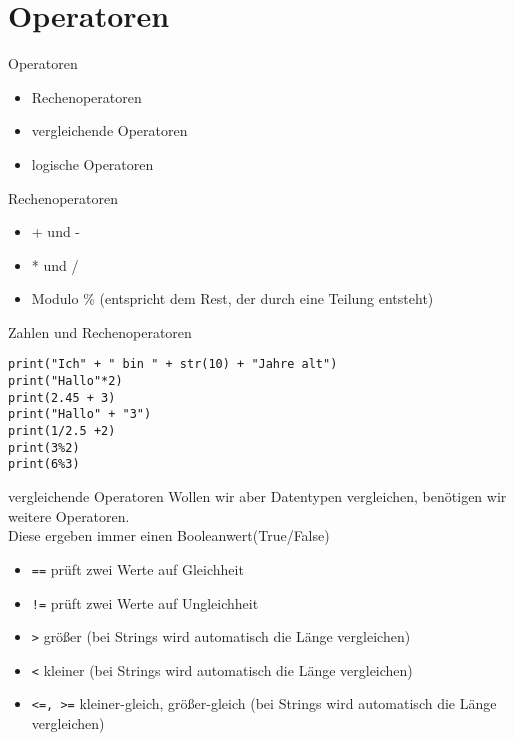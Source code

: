 \section{Operatoren}

\begin{frame}[fragile]{Operatoren}
\begin{itemize}
	\item Rechenoperatoren 
	\item vergleichende Operatoren
	\item logische Operatoren
\end{itemize}
\end{frame}

\begin{frame}[fragile]{Rechenoperatoren}
\begin{itemize}
\item + und -
\item * und /
\item Modulo \% (entspricht dem Rest, der durch eine Teilung entsteht)
\end{itemize}
\end{frame}


\begin{frame}[fragile]{Zahlen und Rechenoperatoren}
\begin{lstlisting}
print("Ich" + " bin " + str(10) + "Jahre alt")
print("Hallo"*2)
print(2.45 + 3)
print("Hallo" + "3")
print(1/2.5 +2)
print(3%2)
print(6%3)
\end{lstlisting}
\end{frame}



\begin{frame}[fragile]{vergleichende Operatoren}
Wollen wir aber Datentypen vergleichen, benötigen wir weitere Operatoren.\\
Diese ergeben immer einen Booleanwert(True/False)\\

\begin{itemize}
\item \texttt{==} prüft zwei Werte auf Gleichheit
\item \texttt{!=} prüft zwei Werte auf Ungleichheit
\item \texttt{>} größer (bei Strings wird automatisch die Länge vergleichen)
\item \texttt{<} kleiner (bei Strings wird automatisch die Länge vergleichen)
\item \texttt{<=, >=}  kleiner-gleich, größer-gleich (bei Strings wird automatisch die Länge vergleichen)

\end{itemize}
\end{frame}

